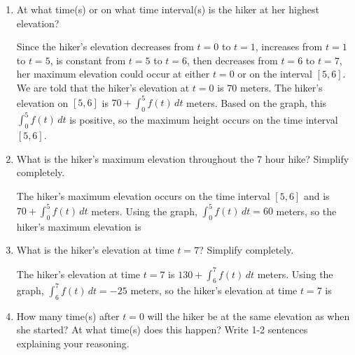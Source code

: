 \documentclass{article}
\begin{document}
\begin{enumerate}
\begin{enumerate}
\begin{enumerate}
    \end{enumerate}

\item 
\begin{problem}
At what time(s) or on what time interval(s) is the hiker at her highest elevation?
\end{problem}
\pspace{0.5in}

\begin{solution}
Since the hiker's elevation decreases from $t=0$ to $t=1$, increases from $t=1$ to $t=5$, is constant from $t=5$ to $t=6$, then decreases from $t=6$ to $t=7$, her maximum elevation could occur at either $t=0$ or on the interval $[5, 6]$. We are told that the hiker's elevation at $t=0$ is $70$ meters. The hiker's elevation on $[5, 6]$ is $70+\int_0^5 f(t)\,dt$ meters. Based on the graph, this $\int_0^5 f(t)\,dt$ is positive, so the maximum height occurs on the time interval $[5, 6]$. 
\end{solution}

\item
\begin{problem}
What is the hiker's maximum elevation throughout the 7 hour hike? Simplify completely.
\end{problem}
\pspace{2in}
      
\begin{solution}
    The hiker's maximum elevation occurs on the time interval $[5, 6]$ and is $70+\int_0^5 f(t)\,dt$ meters. Using the graph, $\int_0^5 f(t)\,dt=60$ meters, so the hiker's maximum elevation is 
\end{solution}

\pspace{\newpage} 


\item  
\begin{problem}
What is the hiker's elevation at time $t=7$? Simplify completely.
\end{problem}
\pspace{\vfill} 

\begin{solution}
    The hiker's elevation at time $t=7$ is $130+\int_6^7 f(t)\,dt$ meters. Using the graph, $\int_6^7 f(t)\,dt =-25$ meters, so the hiker's elevation at time $t=7$ is 
\end{solution}

\item 
\begin{problem}
How many time(s) after $t=0$ will the hiker be at the same elevation as when she started? At what time(s) does this happen? Write 1-2 sentences explaining your reasoning.
\end{problem}


\end{enumerate}
\end{enumerate}
\end{document}
